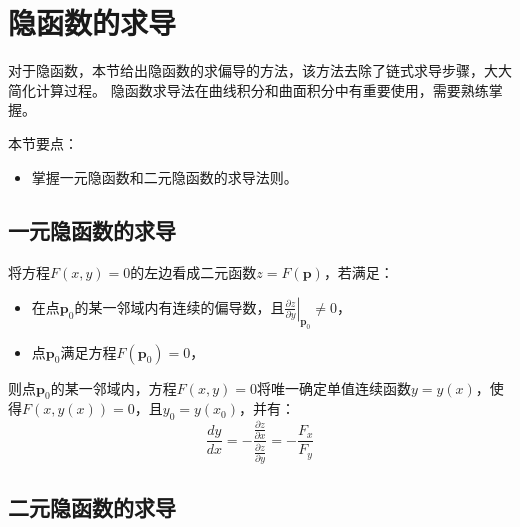 \section{隐函数的求导}

对于隐函数，本节给出隐函数的求偏导的方法，该方法去除了链式求导步骤，大大简化计算过程。
隐函数求导法在曲线积分和曲面积分中有重要使用，需要熟练掌握。

本节要点：
\begin{itemize}
    \item 掌握一元隐函数和二元隐函数的求导法则。
\end{itemize}

\subsection{一元隐函数的求导}

\begin{theorem}[一元隐函数求导定理]
将方程$F\left( x,y \right) =0$的左边看成二元函数$z=F\left( \boldsymbol{p} \right) $，若满足：
\begin{itemize}
    \item 在点$\boldsymbol{p}_0$的某一邻域内有连续的偏导数，且$\left. \frac{\partial z}{\partial y} \right|_{\boldsymbol{p}_0}\ne 0$，
    \item 点$\boldsymbol{p}_0$满足方程$F\left( \boldsymbol{p}_0 \right) =0$，
\end{itemize}
则点$\boldsymbol{p}_0$的某一邻域内，方程$F\left( x,y \right) =0$将唯一确定单值连续函数$y=y\left( x \right) $，使得$F\left( x,y\left( x \right) \right) =0$，且$y_0=y\left( x_0 \right) $，并有：
\[
\frac{dy}{dx}=-\frac{\frac{\partial z}{\partial x}}{\frac{\partial z}{\partial y}}=-\frac{F_x}{F_y}
\]
\end{theorem}

\subsection{二元隐函数的求导}

